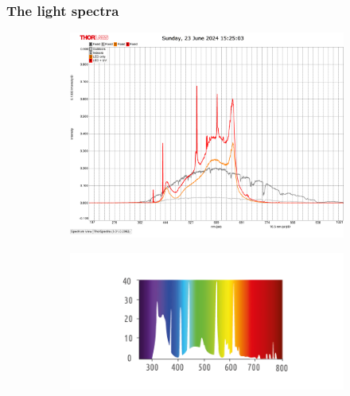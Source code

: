 \documentclass[
    12pt,
    aspectratio=1610,
    b,
    bibliography=../bibliography.bib,
    link-citations]{beamer}
\begin{document}
    \begin{frame}
        \frametitle{The light spectra}
        \begin{figure}
            \begin{minipage}[t]{0.45\textwidth}
                \begin{subfigure}[t]{\textwidth}
                \includegraphics[width=\linewidth]{light-spectra_outdoors_indoors_led_led+uv}
                \end{subfigure}
            \end{minipage}
            \hfill
            \begin{minipage}[b]{0.45\textwidth}
                \begin{subfigure}[t]{0.55\textwidth}
                    \includegraphics[width=\linewidth]{LuxElite_PlantUV_light-spectrum}
                \end{subfigure}
                \vfill
                \begin{subfigure}[b]{0.55\textwidth}

\end{subfigure}
\end{minipage}
\end{figure}
\end{frame}
\end{document}
